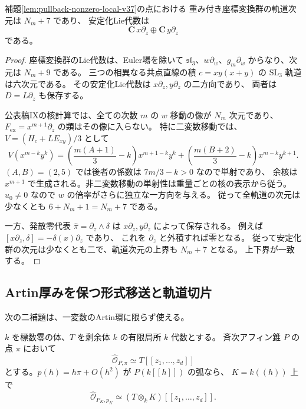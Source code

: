 \begin{lemma}[Poisson安定化群の二方向]
\label{lem:pullback-poisson-stabilizer-v37}
補題\ref{lem:pullback-nonzero-local-v37}の点における
重み付き座標変換群の軌道次元は $N_m+7$ であり、
安定化Lie代数は
\[
 \mathbf C\,x\partial_z\oplus\mathbf C\,y\partial_z
\]
である。
\end{lemma}

\begin{proof}
座標変換群のLie代数は、Euler場を除いて
$\mathfrak{sl}_3$、$w\partial_w$、$g_m\partial_w$ からなり、次元は $N_m+9$ である。
三つの相異なる共点直線の積 $c=xy(x+y)$ の $\mathrm{SL}_3$ 軌道は六次元である。
その安定化Lie代数は $x\partial_z,y\partial_z$ の二方向であり、
両者は $D=L\partial_z$ も保存する。

公表稿IXの核計算では、全ての次数 $m$ の $w$ 移動の像が $N_m$ 次元であり、
$F_{\mathrm{ex}}=x^{m+1}\partial_z$ の類はその像に入らない。
特に二変数移動では、$V=(H_c+LE_{xy})/3$ として
\[
 V(x^{m-k}y^k)=
 \left(\frac{m(A+1)}3-k\right)x^{m+1-k}y^k+
 \left(\frac{m(B+2)}3-k\right)x^{m-k}y^{k+1}.
\]
$(A,B)=(2,5)$ では後者の係数は $7m/3-k>0$ なので単射であり、
余核は $x^{m+1}$ で生成される。非二変数移動の単射性は重量ごとの核の表示から従う。
$u_0\ne0$ なので $w$ の倍率がさらに独立な一方向を与える。
従って全軌道の次元は少なくとも $6+N_m+1=N_m+7$ である。

一方、発散零代表 $\widehat\pi=\partial_z\wedge\delta$ は
$x\partial_z,y\partial_z$ によって保存される。
例えば $[x\partial_z,\delta]=-\delta(x)\partial_z$ であり、
これを $\partial_z$ と外積すれば零となる。
従って安定化群の次元は少なくとも二で、軌道次元の上界も $N_m+7$ となる。
上下界が一致する。
\end{proof}

\subsection{Artin厚みを保つ形式移送と軌道切片}

次の二補題は、一変数のArtin環に限らず使える。

\begin{lemma}[定数Artin厚みを持つ錐の弧]
\label{lem:artin-cone-arc-v37}
$k$ を標数零の体、$T$ を剰余体 $k$ の有限局所 $k$ 代数とする。
斉次アフィン錐 $P$ の点 $\pi$ において
\[
 \widehat{\mathcal O}_{P,\pi}\simeq T[[z_1,\ldots,z_d]]
\]
とする。$p(h)=h\pi+O(h^2)$ が $P(k[[h]])$ の弧なら、
$K=k((h))$ 上で
\[
 \widehat{\mathcal O}_{P_K,p_K}
 \simeq(T\otimes_kK)[[z_1,\ldots,z_d]].
\]
\end{lemma}

